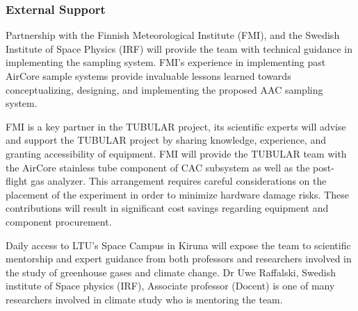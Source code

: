 \subsubsection{External Support}

Partnership with the Finnish Meteorological Institute (FMI), and the Swedish Institute of Space Physics (IRF) will provide the team with technical guidance in implementing the sampling system. FMI’s experience in implementing past AirCore sample systems provide invaluable lessons learned towards conceptualizing, designing, and implementing the proposed AAC sampling system.

FMI is a key partner in the TUBULAR project, its scientific experts will advise and support the TUBULAR project by sharing knowledge, experience, and granting accessibility of equipment. FMI will provide the TUBULAR team with the AirCore stainless tube component of CAC subsystem as well as the post-flight gas analyzer. This arrangement requires careful considerations on the placement of the experiment in order to minimize hardware damage risks. These contributions will result in significant cost savings regarding equipment and component procurement.

Daily access to LTU's Space Campus in Kiruna will expose the team to scientific mentorship and expert guidance from both professors and researchers involved in the study of greenhouse gases and climate change. Dr Uwe Raffalski, Swedish institute of Space physics (IRF), Associate professor (Docent) is one of many researchers involved in climate study who is mentoring the team.